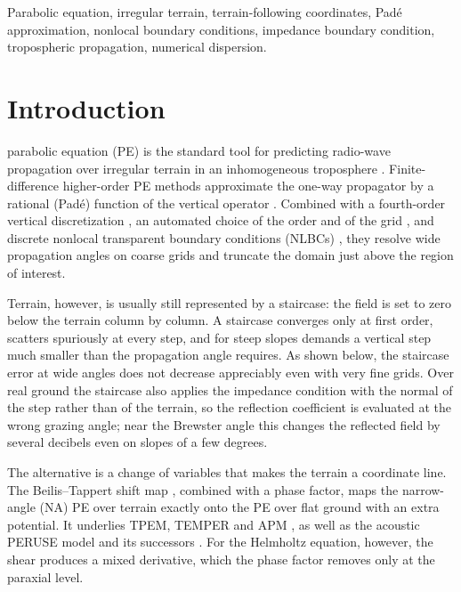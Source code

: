 \documentclass[journal]{IEEEtran}
\begin{document}
\begin{IEEEkeywords}
Parabolic equation, irregular terrain, terrain-following coordinates,
Pad\'e approximation, nonlocal boundary conditions, impedance boundary
condition, tropospheric propagation,
numerical dispersion.
\end{IEEEkeywords}

\section{Introduction}

 parabolic equation (PE) is the standard tool for
predicting radio-wave propagation over irregular terrain in an inhomogeneous
troposphere \cite{levy2000book}. Finite-difference higher-order PE methods
approximate the one-way propagator by a rational (Pad\'e) function of the
vertical operator \cite{collins1993splitstep}. Combined with a fourth-order
vertical discretization \cite{lytaev2020awpl}, an automated choice of the
order and of the grid \cite{lytaev2020iccsa,lytaev2026nmp}, and discrete
nonlocal transparent boundary conditions (NLBCs)
\cite{lytaev2018awpl,lytaev2022radarconf}, they resolve wide propagation angles
on coarse grids and truncate the domain just above the region of interest.

Terrain, however, is usually still represented by a staircase: the field is
set to zero below the terrain column by column. A staircase converges only at
first order, scatters spuriously at every step, and for steep slopes demands a
vertical step much smaller than the propagation angle requires. As shown
below, the staircase error at wide angles does not decrease appreciably even
with very fine grids. Over real ground the staircase also applies the impedance
condition with the normal of the step rather than of the terrain, so the
reflection coefficient is evaluated at the wrong grazing angle; near the
Brewster angle this changes the reflected field by several decibels even on
slopes of a few degrees.

The alternative is a change of variables that makes the terrain a coordinate
line. The Beilis--Tappert shift map \cite{beilis1979coupled}, combined with a
phase factor, maps the narrow-angle (NA) PE over terrain exactly onto the PE
over flat ground with an extra potential. It underlies TPEM, TEMPER and APM
\cite{barrios1994tpem,donohue2000gtpe,barrios2003apm}, as well as the acoustic
PERUSE model \cite{dozier1984peruse} and its successors
\cite{parakkal2012beilis,khodr2020iterative,gilbert2022wabt}. For the Helmholtz
equation, however, the shear produces a mixed derivative, which the phase
factor removes only at the paraxial level.
\end{document}
